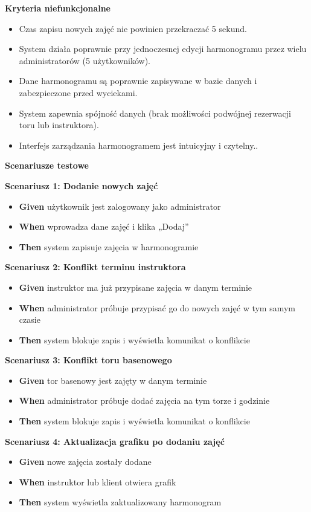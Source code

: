 \documentclass[a4paper,12pt]{article}
\begin{document}
\noindent \textbf{Kryteria niefunkcjonalne}
\begin{itemize}
    \item Czas zapisu nowych zajęć nie powinien przekraczać 5 sekund.
    \item System działa poprawnie przy jednoczesnej edycji harmonogramu przez wielu administratorów (5 użytkowników).
    \item Dane harmonogramu są poprawnie zapisywane w bazie danych i zabezpieczone przed wyciekami.
    \item System zapewnia spójność danych (brak możliwości podwójnej rezerwacji toru lub instruktora).
    \item Interfejs zarządzania harmonogramem jest intuicyjny i czytelny..
\end{itemize}

\noindent \textbf{Scenariusze testowe}

\textbf{Scenariusz 1: Dodanie nowych zajęć}
\begin{itemize}
    \item \textbf{Given} użytkownik jest zalogowany jako administrator
    \item \textbf{When} wprowadza dane zajęć i klika „Dodaj”
    \item \textbf{Then} system zapisuje zajęcia w harmonogramie
\end{itemize}

\textbf{Scenariusz 2: Konflikt terminu instruktora}
\begin{itemize}
    \item \textbf{Given} instruktor ma już przypisane zajęcia w danym terminie
    \item \textbf{When} administrator próbuje przypisać go do nowych zajęć w tym samym czasie
    \item \textbf{Then} system blokuje zapis i wyświetla komunikat o konflikcie
\end{itemize}

\textbf{Scenariusz 3: Konflikt toru basenowego}
\begin{itemize}
    \item \textbf{Given} tor basenowy jest zajęty w danym terminie
    \item \textbf{When} administrator próbuje dodać zajęcia na tym torze i godzinie
    \item \textbf{Then} system blokuje zapis i wyświetla komunikat o konflikcie
\end{itemize}

\textbf{Scenariusz 4: Aktualizacja grafiku po dodaniu zajęć}
\begin{itemize}
    \item \textbf{Given} nowe zajęcia zostały dodane
    \item \textbf{When} instruktor lub klient otwiera grafik
    \item \textbf{Then} system wyświetla zaktualizowany harmonogram
\end{itemize}
\end{document}

